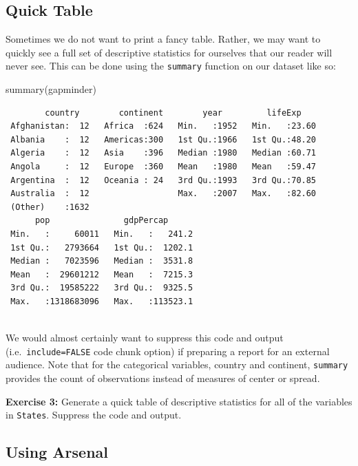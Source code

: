 \documentclass[
]{book}
\makeatletter
\newenvironment{Shaded}{\begin{snugshade}}{\end{snugshade}}
\newcommand{\FunctionTok}[1]{\textcolor[rgb]{0,0,0}{#1}}
\newcommand{\NormalTok}[1]{#1}
\newenvironment{kframe}{%
\medskip{}
\setlength{\fboxsep}{.8em}
 \def\at@end@of@kframe{}%
 \ifinner\ifhmode%
  \def\at@end@of@kframe{\end{minipage}}%
  \begin{minipage}{\columnwidth}%
 \fi\fi%
 \def\FrameCommand##1{\hskip\@totalleftmargin \hskip-\fboxsep
 \colorbox{shadecolor}{##1}\hskip-\fboxsep
     \hskip-\linewidth \hskip-\@totalleftmargin \hskip\columnwidth}%
 \MakeFramed {\advance\hsize-\width
   \@totalleftmargin\z@ \linewidth\hsize
   \@setminipage}}%
 {\par\unskip\endMakeFramed%
 \at@end@of@kframe}
\renewenvironment{Shaded}{\begin{kframe}}{\end{kframe}}
\newenvironment{rmdblock}[1]
  {\begin{shaded*}
  }
  {\end{shaded*}
  }
\newenvironment{learncheck}
  {\begin{rmdblock}{warning}}
  {\end{rmdblock}}
\makeatother
\begin{document}
\hypertarget{quick-table}{%
\subsection{Quick Table}\label{quick-table}}

Sometimes we do not want to print a fancy table. Rather, we may want to quickly see a full set of descriptive statistics for ourselves that our reader will never see. This can be done using the \texttt{summary} function on our dataset like so:

\begin{Shaded}
\begin{Highlighting}[]
\FunctionTok{summary}\NormalTok{(gapminder)}
\end{Highlighting}
\end{Shaded}

\begin{verbatim}
        country        continent        year         lifeExp     
 Afghanistan:  12   Africa  :624   Min.   :1952   Min.   :23.60  
 Albania    :  12   Americas:300   1st Qu.:1966   1st Qu.:48.20  
 Algeria    :  12   Asia    :396   Median :1980   Median :60.71  
 Angola     :  12   Europe  :360   Mean   :1980   Mean   :59.47  
 Argentina  :  12   Oceania : 24   3rd Qu.:1993   3rd Qu.:70.85  
 Australia  :  12                  Max.   :2007   Max.   :82.60  
 (Other)    :1632                                                
      pop               gdpPercap       
 Min.   :     60011   Min.   :   241.2  
 1st Qu.:   2793664   1st Qu.:  1202.1  
 Median :   7023596   Median :  3531.8  
 Mean   :  29601212   Mean   :  7215.3  
 3rd Qu.:  19585222   3rd Qu.:  9325.5  
 Max.   :1318683096   Max.   :113523.1  
                                        
\end{verbatim}

We would almost certainly want to suppress this code and output (i.e.~\texttt{include=FALSE} code chunk option) if preparing a report for an external audience. Note that for the categorical variables, country and continent, \texttt{summary} provides the count of observations instead of measures of center or spread.

\begin{learncheck}
\textbf{Exercise 3:} Generate a quick table of descriptive statistics
for all of the variables in \texttt{States}. Suppress the code and
output.
\end{learncheck}

\hypertarget{using-arsenal}{%
\subsection{Using Arsenal}\label{using-arsenal}}
\end{document}
